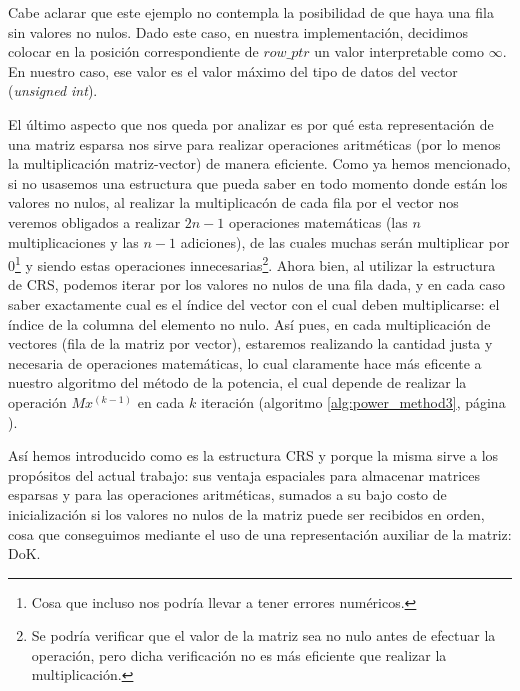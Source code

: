 \par Cabe aclarar que este ejemplo no contempla la posibilidad de que haya una
fila sin valores no nulos. Dado este caso, en nuestra implementaci\'on,
decidimos colocar en la posici\'on correspondiente de $row\_ptr$ un valor
interpretable como $\infty$. En nuestro caso, ese valor es el valor m\'aximo del
tipo de datos del vector (\emph{unsigned int})\cite{stl_limits}.

\par El \'ultimo aspecto que nos queda por analizar es por qu\'e esta
representaci\'on de una matriz esparsa nos sirve para realizar operaciones
aritm\'eticas (por lo menos la multiplicaci\'on matriz-vector) de manera
eficiente. Como ya hemos mencionado, si no usasemos una estructura que pueda
saber en todo momento donde est\'an los valores no nulos, al realizar la
multiplicac\'on de cada fila por el vector nos veremos obligados a realizar
$2n-1$ operaciones matem\'aticas (las $n$ multiplicaciones y las $n-1$
adiciones), de las cuales muchas ser\'an multiplicar por $0$\footnote{Cosa que
incluso nos podr\'ia llevar a tener errores num\'ericos.} y siendo estas
operaciones innecesarias\footnote{Se podr\'ia verificar que el valor de la
matriz sea no nulo antes de efectuar la operaci\'on, pero dicha verificaci\'on
no es m\'as eficiente que realizar la multiplicaci\'on.}. Ahora bien, al
utilizar la estructura de CRS, podemos iterar por los valores no nulos de una
fila dada, y en cada caso saber exactamente cual es el \'indice del vector con
el cual deben multiplicarse: el \'indice de la columna del elemento no nulo.
As\'i pues, en cada multiplicaci\'on de vectores (fila de la matriz por vector),
estaremos realizando la cantidad justa y necesaria de operaciones matem\'aticas,
lo cual claramente hace m\'as eficente a nuestro algoritmo del m\'etodo de la
potencia, el cual depende de realizar la operaci\'on $Mx^{(k-1)}$ en cada $k$
iteraci\'on (algoritmo \ref{alg:power_method3}, p\'agina
\pageref{alg:power_method3}).

\par As\'i hemos introducido como es la estructura CRS y porque la misma sirve a
los prop\'ositos del actual trabajo: sus ventaja espaciales para almacenar
matrices esparsas y para las operaciones aritm\'eticas, sumados a su bajo costo
de inicializaci\'on si los valores no nulos de la matriz puede ser recibidos en
orden, cosa que conseguimos mediante el uso de una representaci\'on auxiliar de
la matriz: DoK.

